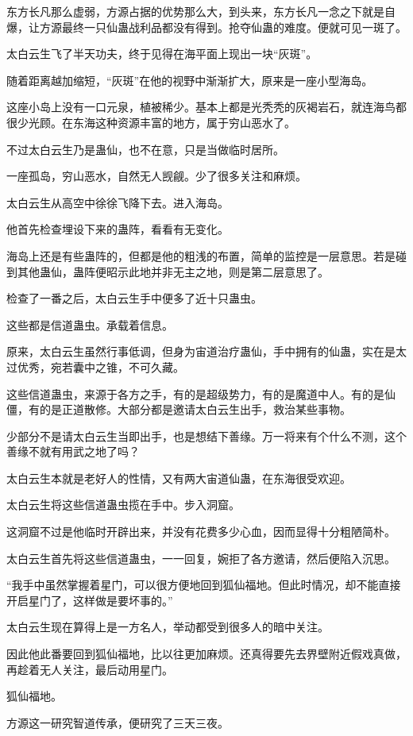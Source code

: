 \begin{this_body}
东方长凡那么虚弱，方源占据的优势那么大，到头来，东方长凡一念之下就是自爆，让方源最终一只仙蛊战利品都没有得到。抢夺仙蛊的难度。便就可见一斑了。

太白云生飞了半天功夫，终于见得在海平面上现出一块“灰斑”。

随着距离越加缩短，“灰斑”在他的视野中渐渐扩大，原来是一座小型海岛。

这座小岛上没有一口元泉，植被稀少。基本上都是光秃秃的灰褐岩石，就连海鸟都很少光顾。在东海这种资源丰富的地方，属于穷山恶水了。

不过太白云生乃是蛊仙，也不在意，只是当做临时居所。

一座孤岛，穷山恶水，自然无人觊觎。少了很多关注和麻烦。

太白云生从高空中徐徐飞降下去。进入海岛。

他首先检查埋设下来的蛊阵，看看有无变化。

海岛上还是有些蛊阵的，但都是他的粗浅的布置，简单的监控是一层意思。若是碰到其他蛊仙，蛊阵便昭示此地并非无主之地，则是第二层意思了。

检查了一番之后，太白云生手中便多了近十只蛊虫。

这些都是信道蛊虫。承载着信息。

原来，太白云生虽然行事低调，但身为宙道治疗蛊仙，手中拥有的仙蛊，实在是太过优秀，宛若囊中之锥，不可久藏。

这些信道蛊虫，来源于各方之手，有的是超级势力，有的是魔道中人。有的是仙僵，有的是正道散修。大部分都是邀请太白云生出手，救治某些事物。

少部分不是请太白云生当即出手，也是想结下善缘。万一将来有个什么不测，这个善缘不就有用武之地了吗？

太白云生本就是老好人的性情，又有两大宙道仙蛊，在东海很受欢迎。

太白云生将这些信道蛊虫揽在手中。步入洞窟。

这洞窟不过是他临时开辟出来，并没有花费多少心血，因而显得十分粗陋简朴。

太白云生首先将这些信道蛊虫，一一回复，婉拒了各方邀请，然后便陷入沉思。

“我手中虽然掌握着星门，可以很方便地回到狐仙福地。但此时情况，却不能直接开启星门了，这样做是要坏事的。”

太白云生现在算得上是一方名人，举动都受到很多人的暗中关注。

因此他此番要回到狐仙福地，比以往更加麻烦。还真得要先去界壁附近假戏真做，再趁着无人关注，最后动用星门。

狐仙福地。

方源这一研究智道传承，便研究了三天三夜。


\end{this_body}
